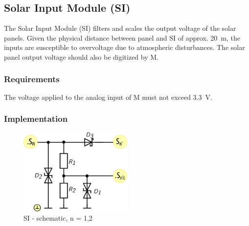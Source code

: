 \subsection{Solar Input Module (SI) }
\label{sec:SI}

The Solar Input Module (SI) filters and scales the output voltage of the solar panels.
Given the physical distance between panel and SI of approx. \SI{20}{\meter}, the inputs are susceptible
to overvoltage due to atmospheric disturbances. The solar panel output voltage should also be
digitized by \mu M.


\subsubsection{Requirements}

The voltage applied to the analog input of \mu M must not exceed \SI{3.3}{\volt}.


\subsubsection{Implementation}


\begin{figure}[h]
    \centering
    \includegraphics[width=0.5\textwidth]{PO/SI/SI}
    \caption{SI - schematic, n = 1,2}
\end{figure}


